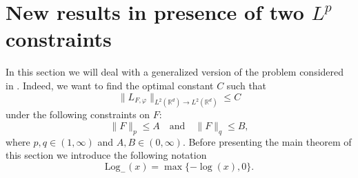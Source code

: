 \documentclass[corpo=11pt, stile=classica, tipotesi=custom,
greek, evenboxes, english]{toptesi}
\numberwithin{equation}{chapter}
\theoremstyle{definition}
\theoremstyle{remark}
\newcommand{\R}{\mathbb{R}} %
\newcommand{\Log}{\ensuremath{\mathrm{Log}_-}}
\begin{document}
\section{New results in presence of two $L^p$ constraints}
In this section we will deal with a generalized version of the problem considered in \cite{nicolatilli_norm}. Indeed, we want to find the optimal constant $C$ such that
\begin{equation*}
	\| L_{F, \varphi} \|_{L^2(\R^d) \rightarrow L^2(\R^d)} \leq C
\end{equation*}
under the following constraints on $F$:
\begin{equation}\label{constraints generic case}
	\|F \|_p \leq A \quad \text{and} \quad \|F\|_q \leq B,
\end{equation}
where $p,q \in (1,\infty)$ and $A,B \in (0,\infty)$. Before presenting the main theorem of this section we introduce the following notation
\begin{equation*}
	\Log(x) = \max\{-\log(x),0\}.
\end{equation*}
\end{document}
